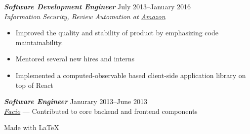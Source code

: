 \documentclass[line,letterpaper]{resume}
\begin{document}
\begin{resume}
    {\sl\textbf{Software Development Engineer}} \hfill July 2013--January
    2016\\
    \emph{Information Security, Review Automation at
    \underline{\href{http://www.amazon.com/}{Amazon}}}
    \begin{itemize}
        \item Improved the quality and stability of product by emphasizing code
            maintainability.
        \item Mentored several new hires and interns
        \item Implemented a computed-observable based client-side application
            library on top of React
    \end{itemize}
    \vspace{-6pt}

    {\sl\textbf{Software Engineer}} \hfill Janurary 2013--June 2013\\
    \emph{\underline{\href{http://www.facio.com/}{Facio}}} --- Contributed to core backend and frontend components
    \vspace{-6pt}

\end{resume}

\vspace{50pt}

\hfill Made with \LaTeX{}
\end{document}
